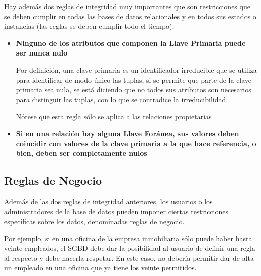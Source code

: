 \documentclass[12pt, fleqn]{report}                             %
\begin{document}
                Hay además dos reglas de integridad muy importantes que son restricciones que se
                deben cumplir en todas las bases de datos relacionales y en todos sus estados o
                instancias (las reglas se deben cumplir todo el tiempo). 


                \begin{itemize}
                    \item
                        \textbf{Ninguno de los atributos que componen la Llave Primaria
                        puede ser nunca nulo}

                        Por definición, una clave primaria es un identificador irreducible que se 
                        utiliza para identificar de modo único las tuplas, si se permite que parte
                        de la clave primaria sea nula, se está diciendo que no todos sus atributos
                        son necesarios para distinguir las tuplas, con lo que se contradice la
                        irreducibilidad.

                        Nótese que esta regla sólo se aplica a las relaciones propietarias


                    \item
                        \textbf{Si en una relación hay alguna Llave Foránea, sus valores deben
                        coincidir con valores de la clave primaria a la que hace referencia, o bien,
                        deben ser completamente nulos}

                \end{itemize}


            \subsection{Reglas de Negocio}

                Además de las dos reglas de integridad anteriores, los usuarios o los administradores
                de la base de datos pueden imponer ciertas restricciones específicas sobre los datos,
                denominadas reglas de negocio.

                Por ejemplo, si en una oficina de la empresa inmobiliaria sólo puede haber hasta veinte
                empleados, el SGBD debe dar la posibilidad al usuario de definir una regla al respecto
                y debe hacerla respetar.
                En este caso, no debería permitir dar de alta un empleado en una oficina que ya tiene
                los veinte permitidos.
\end{document}
